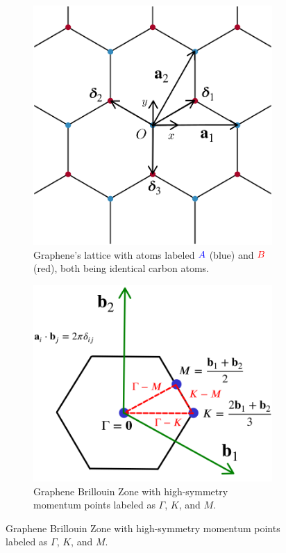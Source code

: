
\begin{figure}[H]
\centering
\begin{subfigure}{.48\textwidth}
  \centering
  \includegraphics[height=.78\linewidth]{fig/honeycomb_coordinates_deltas.png}
  \caption{Graphene's lattice with atoms labeled $\textcolor{blue}{A}$ (blue) and $\textcolor{red}{B}$ (red), both being identical carbon atoms.}
  \label{fig:graphene-lattice_a}
\end{subfigure} \hfill
\begin{subfigure}{.48\textwidth}
  \centering
  \includegraphics[height=.78\linewidth]{fig/honeycomb_tqc_BZ.png}
  \caption{Graphene Brillouin Zone with high-symmetry momentum points labeled as $\Gamma$, $K$, and $M$.}
  \label{fig:graphene-lattice_b}
\end{subfigure}
\label{fig:graphene-lattice}
\end{figure}

